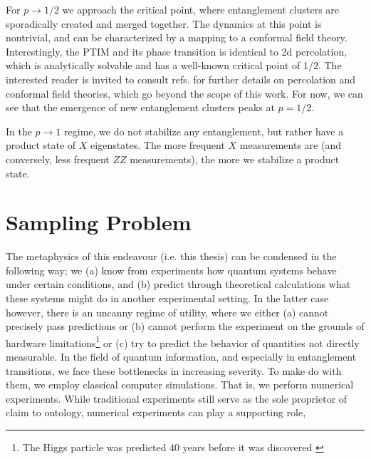 For $p \to 1 /2$ we approach the critical point,
where entanglement clusters are sporadically created and merged together. The
dynamics at this point is nontrivial, and can be characterized by a mapping to
a conformal field theory. Interestingly, the PTIM and its phase transition is
identical to 2d percolation, which is analytically solvable and has a
well-known critical point of $1 /2$. The interested reader is invited to
consult refs.
\cite{aharonyIntroductionPercolationTheory2017,difrancescoConformalFieldTheory1997}
for further details on percolation and conformal field theories, which go
beyond the scope of this work. For now, we can see that the emergence of new
entanglement clusters peaks at $p = 1 /2$.

In the $p\to 1$ regime, we do not stabilize any entanglement, but rather
have a product state of $X$ eigenstates. The more frequent $X$ measurements are
(and conversely, less frequent $ZZ$ measurements), the more we stabilize a
product state.


\section{Sampling Problem}\label{sec:sampling}

The metaphysics of this endeavour (i.e. this thesis) can be condensed in the
following way; we (a) know from experiments how quantum systems behave under
certain conditions, and (b) predict through theoretical calculations what these
systems might do in another experimental setting. In the latter case however,
there is an uncanny regime of utility, where we either (a) cannot precisely
pass predictions or (b) cannot perform the experiment on the grounds of
hardware limitations\footnote{The Higgs particle was predicted 40 years before
it was discovered \cite{nobelprize.orgNobelPrizePhysics2013}} or (c) try to
predict the behavior of quantities not directly measurable. In the field of
quantum information, and especially in entanglement transitions, we face these
bottlenecks in increasing severity. To make do with them, we employ classical
computer simulations. That is, we perform numerical experiments. While
traditional experiments still serve as the sole proprietor of claim to
ontology, numerical experiments can play a supporting role, 

